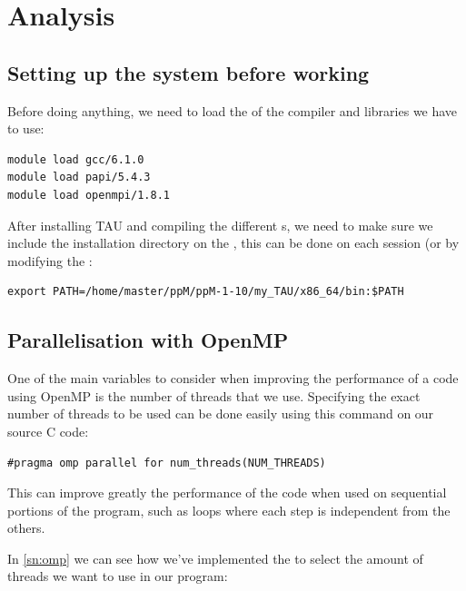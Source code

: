 \section{Analysis}

\subsection{Setting up the system before working}

Before doing anything, we need to load the  of the compiler and libraries we have to use:
\begin{lstlisting}
module load gcc/6.1.0
module load papi/5.4.3
module load openmpi/1.8.1
\end{lstlisting}

After installing TAU and compiling the different s, we need to make sure we include the installation directory on the , this can be done on each session (or by modifying the :
\begin{lstlisting}
export PATH=/home/master/ppM/ppM-1-10/my_TAU/x86_64/bin:$PATH
\end{lstlisting}

\subsection{Parallelisation with OpenMP}

One of the main variables to consider when improving the performance of a code using OpenMP is the number of threads that we use. Specifying the exact number of threads to be used can be done easily using this command on our source C code:

\begin{lstlisting}
#pragma omp parallel for num_threads(NUM_THREADS)
\end{lstlisting}

This can improve greatly the performance of the code when used on sequential portions of the program, such as loops where each step is independent from the others.

In \cref{sn:omp} we can see how we've implemented the  to select the amount of threads we want to use in our program:

